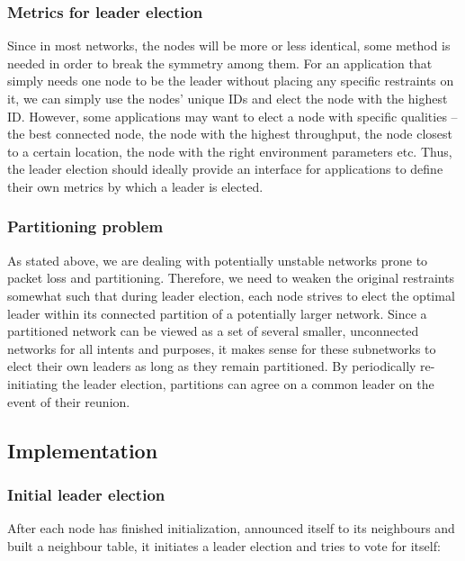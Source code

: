 \documentclass[11pt,
  a4paper,
  ngerman,
  BCOR=7mm
]{scrartcl}
\begin{document}
\subsubsection*{Metrics for leader election}
\label{ssub:leader_election_metrics}
Since in most networks, the nodes will be more or less identical, some
method is needed in order to break the symmetry among them. For an
application that simply needs one node to be the leader without placing
any specific restraints on it, we can simply use the nodes' unique IDs
and elect the node with the highest ID. However, some applications may
want to elect a node with specific qualities -- the best connected node,
the node with the highest throughput, the node closest to a certain
location, the node with the right environment parameters etc. Thus, the
leader election should ideally provide an interface for applications to
define their own metrics by which a leader is elected.

\subsubsection*{Partitioning problem}
\label{ssub:partitioning_problem}
As stated above, we are dealing with potentially unstable networks prone
to packet loss and partitioning. Therefore, we need to weaken the
original restraints somewhat such that during leader election, each node
strives to elect the optimal leader within its connected partition of
a potentially larger network. Since a partitioned network can be viewed
as a set of several smaller, unconnected networks for all intents and
purposes, it makes sense for these subnetworks to elect their own
leaders as long as they remain partitioned. By periodically
re-initiating the leader election, partitions can agree on a common
leader on the event of their reunion.

\subsection*{Implementation}
\label{sub:implementation_leader_election}

\subsubsection*{Initial leader election}
\label{ssub:initial_leader_election}
After each node has finished initialization, announced itself to its
neighbours and built a neighbour table, it initiates a leader election
and tries to vote for itself:
\end{document}
